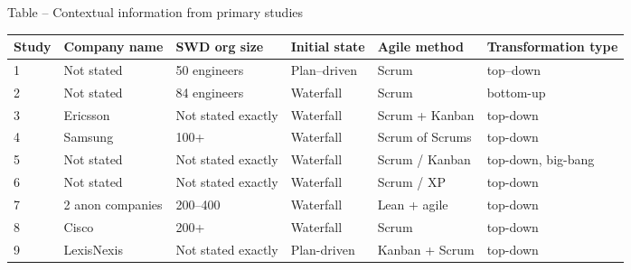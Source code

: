 \centering
Table – Contextual information from primary studies

\begin{tabular}{p{3em} l l l l l }
    \bfseries{Study} & \bfseries{Company name} & \bfseries{SWD org size} & \bfseries{Initial state} & \bfseries{Agile method} & \bfseries{Transformation type} \\
    \hline
    1 & Not stated & 50 engineers & Plan–driven & Scrum & top–down \\
    2 & Not stated & 84 engineers & Waterfall & Scrum & bottom-up \\
    3 & Ericsson & Not stated exactly & Waterfall & Scrum + Kanban & top-down \\
    4 & Samsung & 100+ & Waterfall & Scrum of Scrums & top-down \\
    5 & Not stated & Not stated exactly & Waterfall & Scrum / Kanban & top-down, big-bang \\
    6 & Not stated & Not stated exactly & Waterfall & Scrum / XP & top-down \\
    7 & 2 anon companies & 200–400 & Waterfall & Lean + agile & top-down \\
    8 & Cisco & 200+ & Waterfall & Scrum & top-down \\
    9 & LexisNexis & Not stated exactly & Plan-driven & Kanban + Scrum & top-down \\
    \hline
\end{tabular}
\justify

